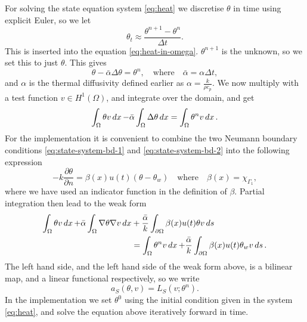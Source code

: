 For solving the state equation system \eqref{eq:heat} we discretise $\theta$ in time using explicit Euler, so we let
\begin{equation*}
    \theta_t \approx \frac{\theta^{n+1} - \theta^n}{\Delta t}.
\end{equation*}
This is inserted into the equation \eqref{eq:heat-in-omega}. $\theta^{n+1}$ is the unknown, so we set this to just $\theta$. This gives
\begin{equation*}
    \theta - \bar{\alpha}\Delta \theta = \theta^n, \quad\textrm{where}\quad \bar{\alpha} = \alpha\Delta t,
\end{equation*}
and $\alpha$ is the thermal diffusivity defined earlier as $\alpha = \frac{k}{\rho c_p}$. We now multiply with a test function $v\in H^1(\Omega)$, and integrate over the domain, and get
\begin{equation*}
    \int_\Omega \theta v \mathop{dx} - \bar{\alpha}\int_\Omega \Delta\theta\mathop{dx} = \int_\Omega \theta^n v\mathop{dx}.
\end{equation*}
For the implementation it is convenient to combine the two Neumann boundary conditions \eqref{eq:state-system-bd-1} and \eqref{eq:state-system-bd-2} into the following expression
\begin{equation*}
    -k\frac{\partial \theta}{\partial n} = \beta(x)u(t)(\theta - \theta_w) \quad\text{where}\quad \beta(x) = \chi_{\Gamma_1},
\end{equation*}
where we have used an indicator function in the definition of $\beta$.
Partial integration then lead to the weak form
\begin{equation*}
\begin{aligned}
    \int_\Omega \theta v\mathop{dx} + \bar{\alpha}\int_\Omega\nabla\theta\nabla v\mathop{dx} &+ \frac{\bar{\alpha}}{k}\int_{\partial\Omega}\beta(x)u(t)\theta v\mathop{ds} \\
    &= \int_\Omega\theta^n v\mathop{dx} + \frac{\bar{\alpha}}{k}\int_{\partial\Omega}\beta(x)u(t)\theta_w v\mathop{ds}.
\end{aligned}
\end{equation*}
The left hand side, and the left hand side of the weak form above, is a bilinear map, and a linear functional respectively, so we write
\begin{equation*}
    a_S(\theta, v) = L_S(v; \theta^n).
\end{equation*}
In the implementation we set $\theta^0$ using the initial condition given in the system \eqref{eq:heat}, and solve the equation above iteratively forward in time.


